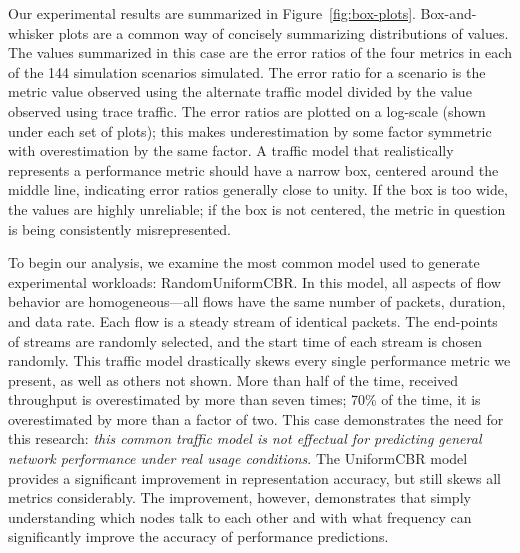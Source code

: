 \documentclass[conference]{IEEEtran}
\newcommand{\caps}[1]{{\small{#1}}}
\begin{document}
Our experimental results are summarized in Figure~\ref{fig:box-plots}. Box-and-whisker plots are a common way of concisely summarizing distributions of values. The values summarized in this case are the error ratios of the four metrics in each of the 144 simulation scenarios simulated. The error ratio for a scenario is the metric value observed using the alternate traffic model divided by the value observed using trace traffic. The error ratios are plotted on a log-scale (shown under each set of plots); this makes underestimation by some factor symmetric with overestimation by the same factor. A traffic model that realistically represents a performance metric should have a narrow box, centered around the middle line, indicating error ratios generally close to unity. If the box is too wide, the values are highly unreliable; if the box is not centered, the metric in question is being consistently misrepresented.

To begin our analysis, we examine the most common model used to generate experimental workloads: RandomUniform\caps{CBR}. In this model, all aspects of flow behavior are homogeneous---all flows have the same number of packets, duration, and data rate. Each flow is a steady stream of identical packets. The end-points of streams are randomly selected, and the start time of each stream is chosen randomly. This traffic model drastically skews every single performance metric we present, as well as others not shown. More than half of the time, received throughput is overestimated by more than seven times; 70\% of the time, it is overestimated by more than a factor of two. This case demonstrates the need for this research: \textit{this common traffic model is not effectual for predicting general network performance under real usage conditions}. The Uniform\caps{CBR} model provides a significant improvement in representation accuracy, but still skews all metrics considerably. The improvement, however, demonstrates that simply understanding which nodes talk to each other and with what frequency can significantly improve the accuracy of performance predictions.
\end{document}
